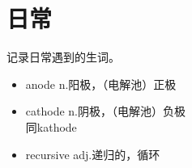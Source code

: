 \chapter{日常}
\begin{intro}
    \centering 记录日常遇到的生词。
\end{intro}

\begin{multicols*}{2}
    \begin{itemize}
        \item anode n.阳极，（电解池）正极
        \item cathode n.阴极，（电解池）负极\\同kathode
        \item recursive adj.递归的，循环
    \end{itemize}
\end{multicols*}
